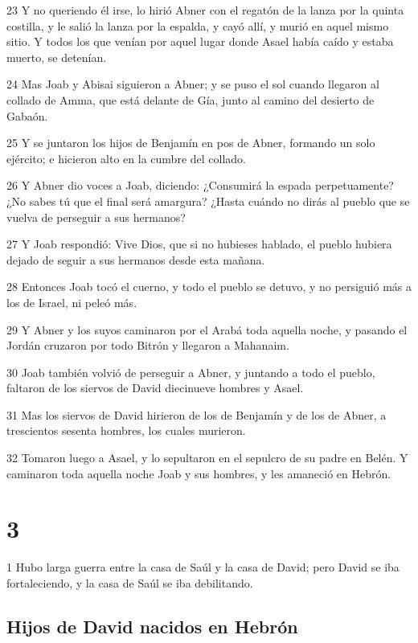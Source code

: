\par 23 Y no queriendo él irse, lo hirió Abner con el regatón de la lanza por la quinta costilla, y le salió la lanza por la espalda, y cayó allí, y murió en aquel mismo sitio. Y todos los que venían por aquel lugar donde Asael había caído y estaba muerto, se detenían.
\par 24 Mas Joab y Abisai siguieron a Abner; y se puso el sol cuando llegaron al collado de Amma, que está delante de Gía, junto al camino del desierto de Gabaón.
\par 25 Y se juntaron los hijos de Benjamín en pos de Abner, formando un solo ejército; e hicieron alto en la cumbre del collado.
\par 26 Y Abner dio voces a Joab, diciendo: ¿Consumirá la espada perpetuamente? ¿No sabes tú que el final será amargura? ¿Hasta cuándo no dirás al pueblo que se vuelva de perseguir a sus hermanos?
\par 27 Y Joab respondió: Vive Dios, que si no hubieses hablado, el pueblo hubiera dejado de seguir a sus hermanos desde esta mañana.
\par 28 Entonces Joab tocó el cuerno, y todo el pueblo se detuvo, y no persiguió más a los de Israel, ni peleó más.
\par 29 Y Abner y los suyos caminaron por el Arabá toda aquella noche, y pasando el Jordán cruzaron por todo Bitrón y llegaron a Mahanaim.
\par 30 Joab también volvió de perseguir a Abner, y juntando a todo el pueblo, faltaron de los siervos de David diecinueve hombres y Asael.
\par 31 Mas los siervos de David hirieron de los de Benjamín y de los de Abner, a trescientos sesenta hombres, los cuales murieron.
\par 32 Tomaron luego a Asael, y lo sepultaron en el sepulcro de su padre en Belén. Y caminaron toda aquella noche Joab y sus hombres, y les amaneció en Hebrón. 

\chapter{3}

\par 1 Hubo larga guerra entre la casa de Saúl y la casa de David; pero David se iba fortaleciendo, y la casa de Saúl se iba debilitando.

\section*{Hijos de David nacidos en Hebrón}

